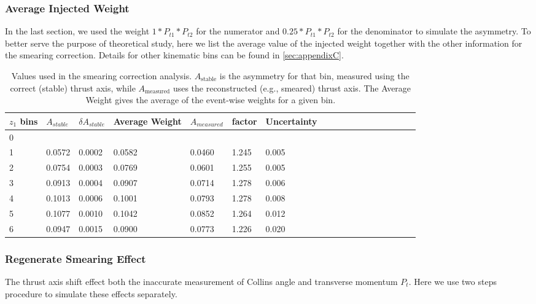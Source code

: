 \subsubsection{Average Injected Weight}
In the last section, we used the weight $1*P_{t1}*P_{t2}$ for the numerator and $0.25*P_{t1}*P_{t2}$ for the denominator to simulate the asymmetry. To better serve the purpose of theoretical study, here we list the average value of the injected weight together with the other information for the smearing correction. Details for other kinematic bins can be found in \ref{sec:appendixC}.
\begin{table}[H]\footnotesize
\centering
\begin{tabular}{|l|l|l|l|l|l|l|l|l|l|l|l|l|l|l|l|l|l|}
\hline
$z_1$ bins & $A_{stable}$ & $\delta A_{stable}$ & Average Weight &  $A_{measured}$ & factor  & Uncertainty\\ \hline
0	&		&		&		&		&		&		\\ \hline
1	&	0.0572	&	0.0002	&	0.0582	&	0.0460	&	1.245	&	0.005	\\ \hline
2	&	0.0754	&	0.0003	&	0.0769	&	0.0601	&	1.255	&	0.005	\\ \hline
3	&	0.0913	&	0.0004	&	0.0907	&	0.0714	&	1.278	&	0.006	\\ \hline
4	&	0.1013	&	0.0006	&	0.1001	&	0.0793	&	1.278	&	0.008	\\ \hline
5	&	0.1077	&	0.0010	&	0.1042	&	0.0852	&	1.264	&	0.012	\\ \hline
6	&	0.0947	&	0.0015	&	0.0900	&	0.0773	&	1.226	&	0.020	\\ \hline
\end{tabular}
\caption[Various values used in the smearing correction]{Values used in the smearing correction analysis. $A_\textrm{stable}$ is the asymmetry for that bin, measured using the correct 
(stable) thrust axis, while $A_\textrm{measured}$ uses the reconstructed 
(e.g., smeared) thrust axis. The Average Weight gives the average of 
the event-wise weights for a given bin.
\label{tab:sinz_smearing_info}}
\end{table}

\iffalse
\subsubsection{\texorpdfstring{Regenerate Smearing Effect}{Regenerated Smearing Effect}} 
\label{sec:regeneratedsmearing}
The thrust axis shift effect both the inaccurate measurement of Collins angle and transverse momentum $P_t$. Here we use two steps procedure to simulate these effects separately.

